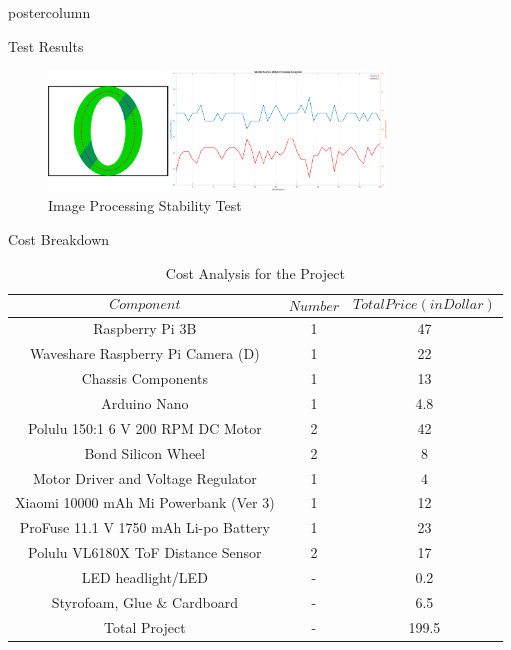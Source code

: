 \documentclass{beamer}
\begin{document}
\begin{frame}
\begin{columns}
\begin{column}{.5\textwidth}
\begin{beamercolorbox}[center]{postercolumn}
\begin{minipage}{.98\textwidth}
{\begin{myblock}{Test Results}
			
			\begin{figure}
				\centering
				\includegraphics[width=0.8\textwidth]{img/stabilityTestS}
				\caption{Image Processing Stability Test}
				\label{fig:stabTest}
			\end{figure}
				\-\vspace{-2cm}
					\end{myblock} \vspace{-0.4em}
					\begin{myblock}{Cost Breakdown}
						\begin{table}[H]
						\centering
						\caption{Cost Analysis for the Project}
						\begin{tabular}{c c c}
							$$Component$$ & $$Number$$ & $$Total Price (in Dollar)$$  \\ \hline
							Raspberry Pi 3B & 1 & 47   \\ 
							Waveshare Raspberry Pi Camera (D) & 1 & 22   \\ 
							Chassis Components & 1 & 13   \\ 
							Arduino Nano & 1 &  4.8 \\ 
							Polulu 150:1 6 V 200 RPM DC Motor & 2 & 42 \\ 
							Bond Silicon Wheel & 2 & 8 \\ 
							Motor Driver and Voltage Regulator & 1 &  4 \\ 
							Xiaomi 10000 mAh Mi Powerbank (Ver 3) & 1 & 12 \\ 
							ProFuse 11.1 V 1750 mAh Li-po Battery  & 1 & 23 \\ 
							Polulu VL6180X ToF Distance Sensor & 2 & 17 \\
							LED headlight/LED & - & 0.2 \\ 
							Styrofoam, Glue $\&$ Cardboard & - & 6.5 \\ \hline
							Total Project & - & 199.5 
						\end{tabular} 
						\label{tab:cost}
					\end{table}
				\-\vspace{-1cm}
					\end{myblock} \vspace{-0.4em}
}
\end{minipage}
\end{beamercolorbox}
\end{column}
\end{columns}
\end{frame}
\end{document}
